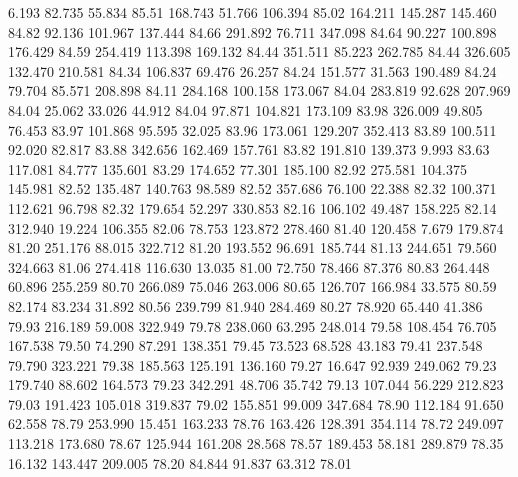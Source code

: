    6.193   82.735   55.834        85.51
 168.743   51.766  106.394        85.02
 164.211  145.287  145.460        84.82
  92.136  101.967  137.444        84.66
 291.892   76.711  347.098        84.64
  90.227  100.898  176.429        84.59
 254.419  113.398  169.132        84.44
 351.511   85.223  262.785        84.44
 326.605  132.470  210.581        84.34
 106.837   69.476   26.257        84.24
 151.577   31.563  190.489        84.24
  79.704   85.571  208.898        84.11
 284.168  100.158  173.067        84.04
 283.819   92.628  207.969        84.04
  25.062   33.026   44.912        84.04
  97.871  104.821  173.109        83.98
 326.009   49.805   76.453        83.97
 101.868   95.595   32.025        83.96
 173.061  129.207  352.413        83.89
 100.511   92.020   82.817        83.88
 342.656  162.469  157.761        83.82
 191.810  139.373    9.993        83.63
 117.081   84.777  135.601        83.29
 174.652   77.301  185.100        82.92
 275.581  104.375  145.981        82.52
 135.487  140.763   98.589        82.52
 357.686   76.100   22.388        82.32
 100.371  112.621   96.798        82.32
 179.654   52.297  330.853        82.16
 106.102   49.487  158.225        82.14
 312.940   19.224  106.355        82.06
  78.753  123.872  278.460        81.40
 120.458    7.679  179.874        81.20
 251.176   88.015  322.712        81.20
 193.552   96.691  185.744        81.13
 244.651   79.560  324.663        81.06
 274.418  116.630   13.035        81.00
  72.750   78.466   87.376        80.83
 264.448   60.896  255.259        80.70
 266.089   75.046  263.006        80.65
 126.707  166.984   33.575        80.59
  82.174   83.234   31.892        80.56
 239.799   81.940  284.469        80.27
  78.920   65.440   41.386        79.93
 216.189   59.008  322.949        79.78
 238.060   63.295  248.014        79.58
 108.454   76.705  167.538        79.50
  74.290   87.291  138.351        79.45
  73.523   68.528   43.183        79.41
 237.548   79.790  323.221        79.38
 185.563  125.191  136.160        79.27
  16.647   92.939  249.062        79.23
 179.740   88.602  164.573        79.23
 342.291   48.706   35.742        79.13
 107.044   56.229  212.823        79.03
 191.423  105.018  319.837        79.02
 155.851   99.009  347.684        78.90
 112.184   91.650   62.558        78.79
 253.990   15.451  163.233        78.76
 163.426  128.391  354.114        78.72
 249.097  113.218  173.680        78.67
 125.944  161.208   28.568        78.57
 189.453   58.181  289.879        78.35
  16.132  143.447  209.005        78.20
  84.844   91.837   63.312        78.01
